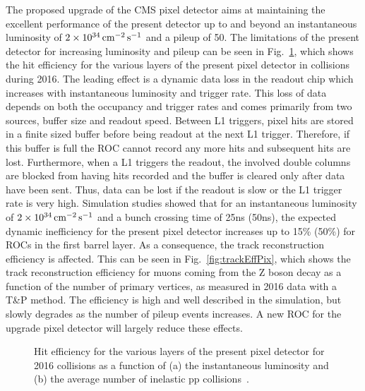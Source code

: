 The proposed upgrade of the CMS pixel detector aims at maintaining the excellent performance of the present detector up to and beyond an instantaneous luminosity of $2\times10^{34}\,\text{cm}^\text{$-$2}\,\text{s}^\text{$-$1}$ and a pileup of 50.
The limitations of the present detector for increasing luminosity and pileup can be seen in Fig.~\ref{fig:PixEff}, which shows the hit efficiency for the various layers of the present pixel detector in collisions during 2016.
The leading effect is a dynamic data loss in the readout chip which increases with instantaneous luminosity and trigger rate. This loss of data depends on both the occupancy and trigger rates and comes primarily from two sources, buffer size and readout speed. Between L1 triggers, pixel hits are stored in a finite sized buffer before being readout at the next L1 trigger. Therefore, if this buffer is full the ROC cannot record any more hits and subsequent hits are lost.
Furthermore, when a L1 triggers the readout, the involved double columns are blocked from having hits recorded and the buffer is cleared only after data have been sent.
Thus, data can be lost if the readout is slow or the L1 trigger rate is very high.
Simulation studies showed that for an instantaneous luminosity of $2\times10^{34}\,\text{cm}^\text{$-$2}\,\text{s}^\text{$-$1}$ and a bunch crossing time of 25\unit{ns} (50\unit{ns}),
the expected dynamic inefficiency for the present pixel detector increases up to 15\% (50\%) for ROCs in the first barrel layer.
As a consequence, the track reconstruction efficiency is affected. This can be seen in Fig.~\ref{fig:trackEffPix}, which shows the track reconstruction efficiency for muons coming from the Z boson decay as a function of the number of primary vertices, as measured in 2016 data with a T\&P method. The efficiency is high and well described in the simulation, but slowly degrades as the number of pileup events increases.
A new ROC for the upgrade pixel detector will largely reduce these effects.\\

\begin{figure}[!htb]
 \begin{center}
 \end{center}
 \caption{Hit efficiency for the various layers of the present pixel detector for 2016 collisions as a function of (a) the instantaneous luminosity and (b) the average number of inelastic pp collisions~\cite{PixelOffline}.}
 \label{fig:PixEff}
\end{figure}


